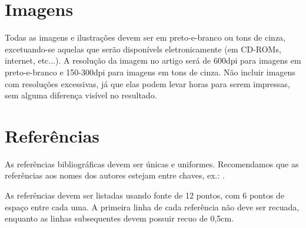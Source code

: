 \documentclass[12pt]{article}
\begin{document}
\section{Imagens}

Todas as imagens e ilustrações devem ser em preto-e-branco ou tons de cinza, excetuando-se aquelas que serão disponívels eletronicamente (em CD-ROMs, internet, etc...). A resolução da imagem no artigo será de 600dpi para imagens em preto-e-branco e 150-300dpi para imagens em tons de cinza. Não incluir imagens com resoluções excessivas, já que elas podem levar horas para serem impressas, sem alguma diferença visível no resultado.

\section{Referências}

As referências bibliográficas devem ser únicas e uniformes. Recomendamos que as referências aos nomes dos autores estejam entre chaves, ex.: \cite{knuth:84}.

As referências devem ser listadas usando fonte de 12 pontos, com 6 pontos de espaço entre cada uma. A primeira linha de cada referência não deve ser recuada, enquanto as linhas subsequentes devem possuir recuo de 0,5cm.



\end{document}
